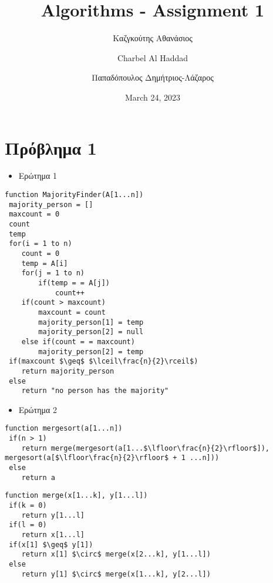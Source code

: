 \documentclass[a4paper]{article}
\title{\textbf{Algorithms - Assignment 1}}
\author{Καζγκούτης Αθανάσιος \and
	    Charbel Al Haddad \and 
	    Παπαδόπουλος Δημήτριος-Λάζαρος
}
\date{March 24, 2023}
\begin{document}
\maketitle
\pagebreak
\section*{Πρόβλημα 1}

\begin{itemize}
\item Ερώτημα 1
\end{itemize}

\lstset{numbers=left, numbersep=5pt,frame=single,  framexleftmargin=15pt}

\begin{lstlisting}[mathescape]
function MajorityFinder(A[1...n])
 majority_person = []
 maxcount = 0
 count
 temp
 for(i = 1 to n)
 	count = 0
 	temp = A[i]
 	for(j = 1 to n)
 		if(temp = = A[j])
 			count++
 	if(count > maxcount)
 		maxcount = count
 		majority_person[1] = temp
 		majority_person[2] = null
 	else if(count = = maxcount)
 		majority_person[2] = temp
 if(maxcount $\geq$ $\lceil\frac{n}{2}\rceil$)
 	return majority_person
 else 
 	return "no person has the majority"
\end{lstlisting}

\begin{itemize}
\item Ερώτημα 2
\end{itemize}

\lstset{frame=none}

\begin{tcolorbox}[colback=blue!20!white,colframe=purple!60!white,title=\textbf{Merge Sort}]
\begin{lstlisting}[mathescape]
function mergesort(a[1...n])
 if(n > 1)
 	return merge(mergesort(a[1...$\lfloor\frac{n}{2}\rfloor$]), mergesort(a[$\lfloor\frac{n}{2}\rfloor$ + 1 ...n]))
 else
 	return a
\end{lstlisting}

\begin{lstlisting}[mathescape]
function merge(x[1...k], y[1...l])
 if(k = 0)
 	return y[1...l]
 if(l = 0)
 	return x[1...l]
 if(x[1] $\geq$ y[1])
 	return x[1] $\circ$ merge(x[2...k], y[1...l])
 else
 	return y[1] $\circ$ merge(x[1...k], y[2...l])
\end{lstlisting}
\end{tcolorbox}

\lstset{numbers=left, numbersep=5pt,frame=single,  framexleftmargin=15pt}
\end{document}
